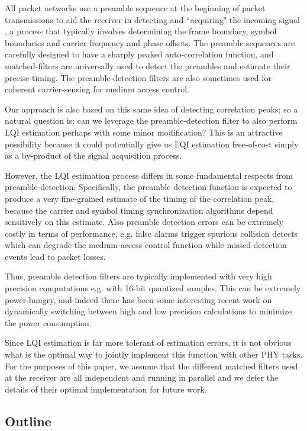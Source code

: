 \documentclass[journal]{IEEEtran}
\begin{document}
All packet networks use a preamble sequence \cite{preamble} at the beginning of
packet transmissions to aid the receiver in detecting and ``acquiring" the
incoming signal \cite{frame_sync}, a process that typically involves
determining the frame boundary, symbol boundaries and carrier frequency and
phase offsets. The preamble sequences are carefully designed to have a sharply
peaked auto-correlation function, and matched-filters are universally used to
detect the preambles and estimate their precise timing. The preamble-detection
filters are also sometimes used for coherent carrier-sensing \cite{cca} for
medium access control.

Our approach is also based on this same idea of detecting correlation peaks; so
a natural question is: can we leverage the preamble-detection filter to also
perform LQI estimation perhaps with some minor modification? This is an
attractive possibility because it could potentially give us LQI estimation
free-of-cost simply as a by-product of the signal acquisition process.

However, the LQI estimation process differs in some fundamental respects from
preamble-detection. Specifically, the preamble detection function is expected
to produce a very fine-grained estimate of the timing of the correlation peak,
because the carrier and symbol timing synchronization algorithms depend
sensitively on this estimate. Also preamble detection errors can be extremely
costly in terms of performance, e.g. false alarms trigger spurious collision
detects which can degrade the medium-access control function while missed
detection events lead to packet losses.

Thus, preamble detection filters are typically implemented with very high
precision computations e.g. with 16-bit quantized samples. This can be
extremely power-hungry, and indeed there has been some interesting recent work
\cite{preamble_detection} on dynamically switching between high and low
precision calculations to minimize the power consumption.

Since LQI estimation is far more tolerant of estimation errors, it is not
obvious what is the optimal way to jointly implement this function with other
PHY tasks. For the purposes of this paper, we assume that the different matched
filters used at the receiver are all independent and running in parallel and we
defer the details of their optimal implementation for future work.

\subsection{Outline}
\end{document}
